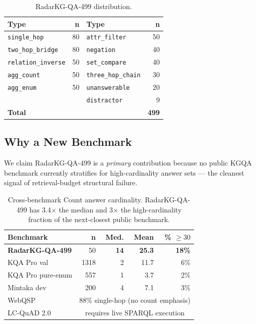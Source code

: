 \documentclass[11pt,a4paper]{article}
\newcommand{\qtype}[1]{\texttt{\small #1}}
\begin{document}
\begin{table}[h]
\centering
\small
\caption{RadarKG-QA-499 distribution.}
\label{tab:qa-dist}
\begin{tabular}{l r l r}
\toprule
\textbf{Type} & \textbf{n} & \textbf{Type} & \textbf{n} \\
\midrule
\qtype{single\_hop}        & 80 & \qtype{attr\_filter}      & 50 \\
\qtype{two\_hop\_bridge}   & 80 & \qtype{negation}          & 40 \\
\qtype{relation\_inverse}  & 50 & \qtype{set\_compare}      & 40 \\
\qtype{agg\_count}         & 50 & \qtype{three\_hop\_chain} & 30 \\
\qtype{agg\_enum}          & 50 & \qtype{unanswerable}      & 20 \\
                           &    & \qtype{distractor}        & 9  \\
\midrule
\multicolumn{3}{l}{\textbf{Total}} & \textbf{499} \\
\bottomrule
\end{tabular}
\end{table}

\subsection{Why a New Benchmark}
\label{sec:bench-design}
We claim RadarKG-QA-499 is a \emph{primary} contribution because no public KGQA benchmark currently stratifies for high-cardinality answer sets --- the cleanest signal of retrieval-budget structural failure.

\begin{table}[h]
\centering
\small
\caption{Cross-benchmark Count answer cardinality. RadarKG-QA-499 has 3.4$\times$ the median and 3$\times$ the high-cardinality fraction of the next-closest public benchmark.}
\label{tab:bench-distribution}
\begin{tabular}{l r r r r}
\toprule
\textbf{Benchmark} & \textbf{n} & \textbf{Med.} & \textbf{Mean} & \textbf{\% $\!\geq\! 30$} \\
\midrule
\textbf{RadarKG-QA-499} & 50 & \textbf{14} & \textbf{25.3} & \textbf{18\%} \\
KQA Pro val            & 1318 & 2 & 11.7 & 6\% \\
KQA Pro pure-enum      & 557 & 1 & 3.7  & 2\% \\
Mintaka dev            & 200 & 4 & 7.1  & 3\% \\
WebQSP                 & \multicolumn{4}{c}{88\% single-hop (no count emphasis)} \\
LC-QuAD 2.0            & \multicolumn{4}{c}{requires live SPARQL execution} \\
\bottomrule
\end{tabular}
\end{table}
\end{document}
